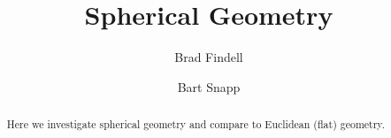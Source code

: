 \documentclass{ximera}
\title{Spherical Geometry}
\author{Brad Findell \and Bart Snapp}
\begin{document}
\begin{abstract}
Here we investigate spherical geometry and compare to Euclidean (flat) geometry. 
\end{abstract}
\maketitle


\end{document}

